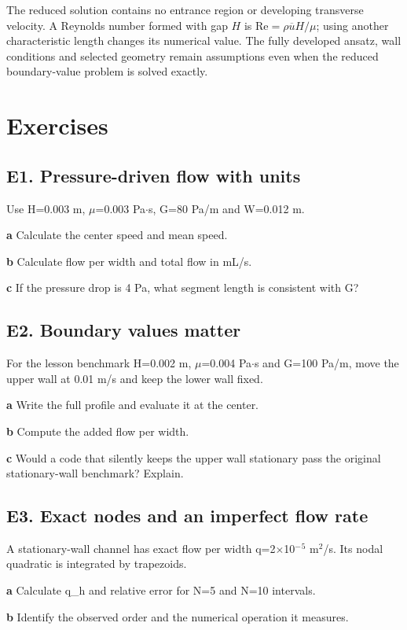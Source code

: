 \documentclass[11pt,letterpaper]{article}
\theoremstyle{definition}\newtheorem{definition}{Definition}\newtheorem{example}{Example}
\numberwithin{equation}{section}
\begin{document}
The reduced solution contains no entrance region or developing transverse velocity. A Reynolds number formed with gap $H$ is $\mathrm{Re}=\rho\overline uH/\mu$; using another characteristic length changes its numerical value. The fully developed ansatz, wall conditions and selected geometry remain assumptions even when the reduced boundary-value problem is solved exactly.
\bigskip
\section*{Exercises}
\par\noindent\begin{minipage}{\linewidth}
\subsection*{E1. Pressure-driven flow with units}
Use H=\allowbreak{}0.003 m, $\mu$=\allowbreak{}0.003 Pa$\cdot$s, G=\allowbreak{}80 Pa/m and W=\allowbreak{}0.012 m.

\textbf{a} Calculate the center speed and mean speed.

\end{minipage}\par\medskip
\textbf{b} Calculate flow per width and total flow in mL/s.

\textbf{c} If the pressure drop is 4 Pa, what segment length is consistent with G?

\par\noindent\begin{minipage}{\linewidth}
\subsection*{E2. Boundary values matter}
For the lesson benchmark H=\allowbreak{}0.002 m, $\mu$=\allowbreak{}0.004 Pa$\cdot$s and G=\allowbreak{}100 Pa/m, move the upper wall at 0.01 m/s and keep the lower wall fixed.

\textbf{a} Write the full profile and evaluate it at the center.

\end{minipage}\par\medskip
\textbf{b} Compute the added flow per width.

\textbf{c} Would a code that silently keeps the upper wall stationary pass the original stationary-wall benchmark? Explain.

\par\noindent\begin{minipage}{\linewidth}
\subsection*{E3. Exact nodes and an imperfect flow rate}
A stationary-wall channel has exact flow per width q=\allowbreak{}2$\times$10$^-$$^5$ m$^2$/s. Its nodal quadratic is integrated by trapezoids.

\textbf{a} Calculate q\_h and relative error for N=\allowbreak{}5 and N=\allowbreak{}10 intervals.

\end{minipage}\par\medskip
\textbf{b} Identify the observed order and the numerical operation it measures.
\end{document}
